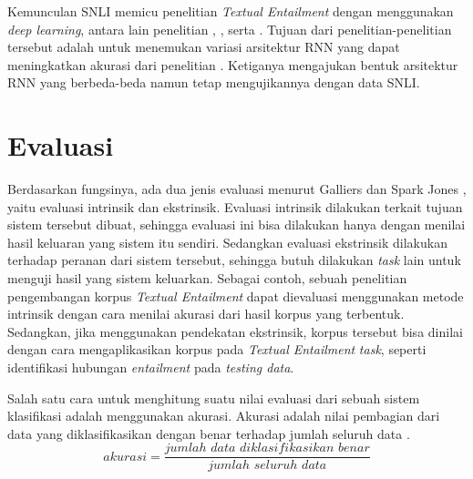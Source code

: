 	Kemunculan SNLI memicu penelitian \textit{Textual Entailment} dengan menggunakan \textit{deep learning}, antara lain penelitian \cite{rnn-1}, \cite{rnn-2}, serta \cite{rnn-3}. Tujuan dari penelitian-penelitian tersebut adalah untuk menemukan variasi arsitektur RNN yang dapat meningkatkan akurasi dari penelitian \cite{snli:emnlp2015}. Ketiganya mengajukan bentuk arsitektur RNN yang berbeda-beda namun tetap mengujikannya dengan data SNLI. 
	
\section{Evaluasi}
Berdasarkan fungsinya, ada dua jenis evaluasi menurut Galliers dan Spark Jones \citep{Jones:1996:ENL:547445}, yaitu evaluasi intrinsik dan ekstrinsik. Evaluasi intrinsik dilakukan terkait tujuan sistem tersebut dibuat, sehingga evaluasi ini bisa dilakukan hanya dengan menilai hasil keluaran yang sistem itu sendiri.  Sedangkan evaluasi ekstrinsik dilakukan terhadap peranan dari sistem tersebut, sehingga butuh dilakukan \textit{task} lain untuk menguji hasil yang sistem keluarkan. Sebagai contoh, sebuah penelitian pengembangan korpus \textit{Textual Entailment} dapat dievaluasi menggunakan metode intrinsik dengan cara menilai akurasi dari hasil korpus yang terbentuk. Sedangkan, jika menggunakan pendekatan ekstrinsik, korpus tersebut bisa dinilai dengan cara mengaplikasikan korpus pada \textit{Textual Entailment} \textit{task}, seperti identifikasi hubungan \textit{entailment} pada \textit{testing data}.
	
Salah satu cara untuk menghitung suatu nilai evaluasi dari sebuah sistem klasifikasi adalah menggunakan akurasi. Akurasi adalah nilai pembagian dari data yang diklasifikasikan dengan benar terhadap jumlah seluruh data \citep{Manning:2008:IIR:1394399}. 
	\begin{equation}
	akurasi = \frac{jumlah\,\,data\,\,diklasifikasikan\,\,benar}{jumlah\,\,seluruh\,\,data}
	\end{equation}
	
